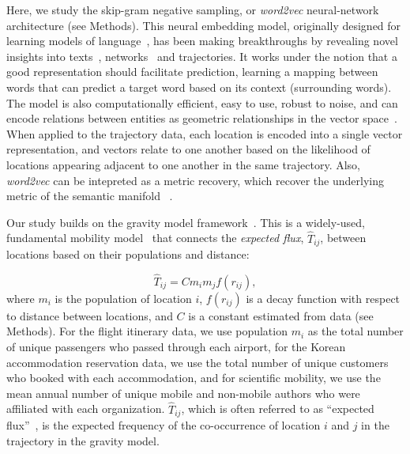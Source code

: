 \documentclass[12pt]{article} %
\begin{document}
Here, we study the skip-gram negative sampling, or \textit{word2vec} neural-network architecture (see Methods).
This neural embedding model, originally designed for learning models of language~\autocite{mikolov2013word2vec}, has been making breakthroughs by revealing novel insights into texts~\autocite{tshitoyan2019mat2vec, garg2018gender, kozlowski2018geometry, hamilton2016diachronic, le2014doc2vec, nakandala2017gendered}, networks~\autocite{grover2016node2vec, perozzi2014deepwalk, linzhuo2020hyperbolic} and trajectories\autocite{liu2016exploring, feng2017poi2vec, yao2018representing, cao2019habit2vec, crivellari2019motion, solomon2018predict}.
It works under the notion that a good representation should facilitate prediction, learning a mapping between words that can predict a target word based on its context (surrounding words).
The model is also computationally efficient, easy to use, robust to noise, and can encode relations between entities as geometric relationships in the vector space~\autocite{levy2014neural, nakandala2017gendered, kozlowski2018geometry, an2018semaxis, hashimoto2016word}.
When applied to the trajectory data, each location is encoded into a single vector representation, and vectors relate to one another based on the likelihood of locations appearing adjacent to one another in the same trajectory. Also,  \textit{word2vec} can be intepreted as a metric recovery, which recover the underlying metric of the semantic manifold ~\autocite{hashimoto2016word}.



Our study builds on the gravity model framework~\autocite{zipf1946gravity}.
This is a widely-used, fundamental mobility model~\autocite{curiel2018citygravity, jung2008highwaygravity, hong2016busgravity, truscott2012epidemicgravity} that connects the \textit{expected flux}, $\hat{T}_{ij}$, between locations based on their populations and distance:

\begin{equation}
	\label{eq:gravity_basic}
	\hat{T}_{ij} = Cm_{i}m_{j}f(r_{ij}),
\end{equation}
where $m_{i}$ is the population of location $i$,  $f(r_{ij})$ is a decay function with respect to distance between locations, and $C$ is a constant estimated from data (see Methods).
For the flight itinerary data, we use population $m_{i}$ as the total number of unique passengers who passed through each airport, for the Korean accommodation reservation data, we use the total number of unique customers who booked with each accommodation, and for scientific mobility, we use the mean annual number of unique mobile and non-mobile authors who were affiliated with each organization.
$\hat{T}_{ij}$, which is often referred to as ``expected flux''~\autocite{simini2012universal}, is the expected frequency of the co-occurrence of location $i$ and $j$ in the trajectory in the gravity model.
\end{document}
